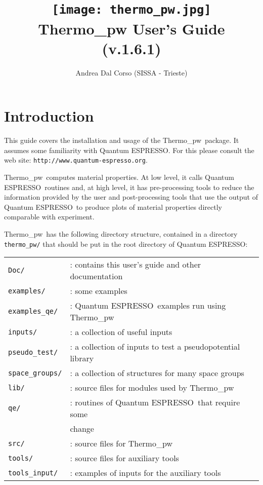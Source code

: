 \documentclass[12pt,a4paper,twoside]{report}
\def\version{1.6.1}
\def\qe{{\sc Quantum ESPRESSO}}
\def\thermo{{\sc Thermo\_pw}}
\begin{document}
 

\author{Andrea Dal Corso (SISSA - Trieste)}
\date{}

\title{
  \texttt{[image: thermo\_pw.jpg]} \\
  \vspace{3truecm}
  \Huge \color{dark-blue} {\sc Thermo}\_{\sc pw} User's Guide \\
  (v.\version)
}

\maketitle

\newpage

\tableofcontents

\newpage

{\color{dark-blue}\chapter{Introduction}}
\color{black}
This guide covers the installation and usage of the \thermo\ package. 
It assumes some familiarity with \qe. 
For this please consult the web site: \texttt{http://www.quantum-espresso.org}.

\thermo\ computes material properties.
At low level, it calls \qe\ routines and, at high level, it has pre-processing
tools to reduce the information provided by the user and
post-processing tools that use the output of \qe\ to produce plots of material 
properties directly comparable with experiment. 

\thermo\ has the following directory structure, contained in a directory 
\texttt{thermo\_pw/} that should be put in the root directory of \qe:

\begin{tabular}{ll}
\texttt{Doc/}      & : contains this user's guide and other documentation\\
\texttt{examples/} & : some examples \\
\texttt{examples\_qe/} & : \qe\ examples run using 
\thermo \\
\texttt{inputs/}   & : a collection of useful inputs \\
\texttt{pseudo\_test/} & : a collection of inputs to test a pseudopotential library\\
\texttt{space\_groups/} & : a collection of structures for many space groups \\
\texttt{lib/}      & : source files for modules used by \thermo\ \\
\texttt{qe/}       & : routines of \qe\ that require some \\
                   &   change \\
\texttt{src/}      & : source files for \thermo\ \\
\texttt{tools/}    & : source files for auxiliary tools \\
\texttt{tools\_input/}  & : examples of inputs for the auxiliary tools \\
\end{tabular}\\
\end{document}
